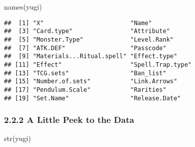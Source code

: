 \documentclass[
]{article}
\newenvironment{Shaded}{\begin{snugshade}}{\end{snugshade}}
\newcommand{\FunctionTok}[1]{\textcolor[rgb]{0.00,0.00,0.00}{#1}}
\newcommand{\NormalTok}[1]{#1}
\begin{document}
\begin{Shaded}
\begin{Highlighting}[]
\FunctionTok{names}\NormalTok{(yugi)}
\end{Highlighting}
\end{Shaded}

\begin{verbatim}
##  [1] "X"                        "Name"                    
##  [3] "Card.type"                "Attribute"               
##  [5] "Monster.Type"             "Level.Rank"              
##  [7] "ATK.DEF"                  "Passcode"                
##  [9] "Materials...Ritual.spell" "Effect.type"             
## [11] "Effect"                   "Spell.Trap.type"         
## [13] "TCG.sets"                 "Ban_list"                
## [15] "Number.of.sets"           "Link.Arrows"             
## [17] "Pendulum.Scale"           "Rarities"                
## [19] "Set.Name"                 "Release.Date"
\end{verbatim}

\hypertarget{a-little-peek-to-the-data}{%
\subsubsection{2.2.2 A Little Peek to the
Data}\label{a-little-peek-to-the-data}}

\begin{Shaded}
\begin{Highlighting}[]
\FunctionTok{str}\NormalTok{(yugi)}
\end{Highlighting}
\end{Shaded}
\end{document}
